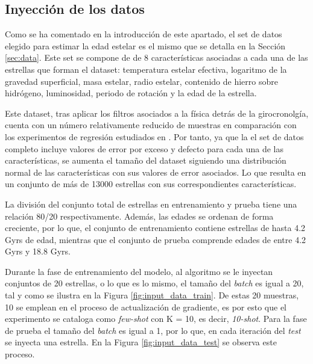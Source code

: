 \subsection{Inyección de los datos} 

Como se ha comentado en la introducción de este apartado, el set de datos elegido para estimar la edad estelar es el mismo que se detalla en la Sección \ref{sec:data}. Este set se compone de de 8 características asociadas a cada una de las estrellas que forman el dataset: temperatura estelar efectiva, logaritmo de la gravedad superficial, masa estelar, radio estelar, contenido de hierro sobre hidrógeno, luminosidad, periodo de rotación y la edad de la estrella.

Este dataset, tras aplicar los filtros asociados a la física detrás de la girocronolgía, cuenta con un número relativamente reducido de muestras en comparación con los experimentos de regresión estudiados en \cite{finn2017modelagnostic}. Por tanto, ya que la el set de datos completo incluye valores de error por exceso y defecto para cada una de las características, se aumenta el tamaño del dataset siguiendo una distribución normal de las características con sus valores de error asociados. Lo que resulta en un conjunto de más de 13000 estrellas con sus correspondientes características.

La división del conjunto total de estrellas en entrenamiento y prueba tiene una relación 80/20 respectivamente. Además, las edades se ordenan de forma creciente, por lo que, el conjunto de entrenamiento contiene estrellas de hasta 4.2 Gyrs de edad, mientras que el conjunto de prueba comprende edades de entre 4.2 Gyrs y 18.8 Gyrs.

Durante la fase de entrenamiento del modelo, al algoritmo se le inyectan conjuntos de 20 estrellas, o lo que es lo mismo, el tamaño del \emph{batch} es igual a 20, tal y como se ilustra en la Figura \ref{fig:input_data_train}. De estas 20 muestras, 10 se emplean en el proceso de actualización de gradiente, es por esto que el experimento se cataloga como \emph{few-shot} con K = 10, es decir, \emph{10-shot}. Para la fase de prueba el tamaño del \emph{batch} es igual a 1, por lo que, en cada iteración del \emph{test} se inyecta una estrella. En la Figura \ref{fig:input_data_test} se observa este proceso.

